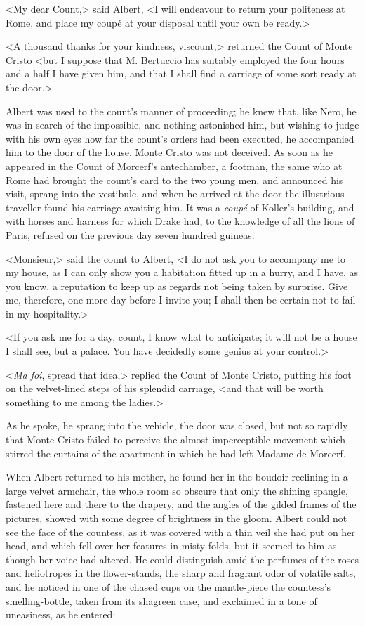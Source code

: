  <My dear Count,> said Albert, <I will endeavour to return your politeness at Rome, and place my coupé at your disposal until your own be ready.> 

 <A thousand thanks for your kindness, viscount,> returned the Count of Monte Cristo <but I suppose that M. Bertuccio has suitably employed the four hours and a half I have given him, and that I shall find a carriage of some sort ready at the door.> 

 Albert was used to the count's manner of proceeding; he knew that, like Nero, he was in search of the impossible, and nothing astonished him, but wishing to judge with his own eyes how far the count's orders had been executed, he accompanied him to the door of the house. Monte Cristo was not deceived. As soon as he appeared in the Count of Morcerf's antechamber, a footman, the same who at Rome had brought the count's card to the two young men, and announced his visit, sprang into the vestibule, and when he arrived at the door the illustrious traveller found his carriage awaiting him. It was a \textit{coupé} of Koller's building, and with horses and harness for which Drake had, to the knowledge of all the lions of Paris, refused on the previous day seven hundred guineas. 

 <Monsieur,> said the count to Albert, <I do not ask you to accompany me to my house, as I can only show you a habitation fitted up in a hurry, and I have, as you know, a reputation to keep up as regards not being taken by surprise. Give me, therefore, one more day before I invite you; I shall then be certain not to fail in my hospitality.> 

 <If you ask me for a day, count, I know what to anticipate; it will not be a house I shall see, but a palace. You have decidedly some genius at your control.> 

 <\textit{Ma foi}, spread that idea,> replied the Count of Monte Cristo, putting his foot on the velvet-lined steps of his splendid carriage, <and that will be worth something to me among the ladies.> 

 As he spoke, he sprang into the vehicle, the door was closed, but not so rapidly that Monte Cristo failed to perceive the almost imperceptible movement which stirred the curtains of the apartment in which he had left Madame de Morcerf. 

 When Albert returned to his mother, he found her in the boudoir reclining in a large velvet armchair, the whole room so obscure that only the shining spangle, fastened here and there to the drapery, and the angles of the gilded frames of the pictures, showed with some degree of brightness in the gloom. Albert could not see the face of the countess, as it was covered with a thin veil she had put on her head, and which fell over her features in misty folds, but it seemed to him as though her voice had altered. He could distinguish amid the perfumes of the roses and heliotropes in the flower-stands, the sharp and fragrant odor of volatile salts, and he noticed in one of the chased cups on the mantle-piece the countess's smelling-bottle, taken from its shagreen case, and exclaimed in a tone of uneasiness, as he entered: 

